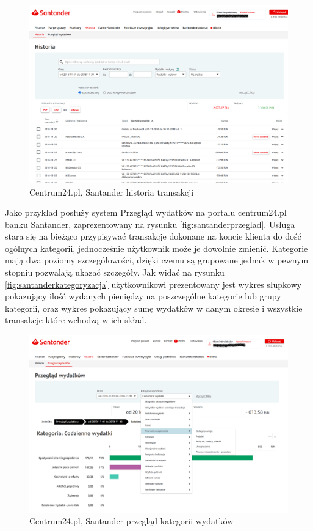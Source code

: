 \documentclass[a4paper, 10pt, twoside, openright]{report}
\begin{document}
\begin{large}
\begin{figure}[H]           %
    \centering
    \includegraphics[width=12cm]{figures/Santander_PrzegladWydatkow_historia.png}
    \caption{Centrum24.pl, Santander historia transakcji}
    \label{fig:santanderhistoria}
\end{figure}

{Jako przykład posłuży system Przegląd wydatków na portalu centrum24.pl banku 
Santander, zaprezentowany na rysunku \ref{fig:santanderprzeglad}. Usługa stara 
się na bieżąco przypisywać transakcje dokonane na koncie klienta do dość 
ogólnych kategorii, jednocześnie użytkownik może je dowolnie zmienić. Kategorie 
mają dwa poziomy szczegółowości, dzięki czemu są grupowane jednak w pewnym 
stopniu pozwalają ukazać szczegóły. Jak widać na rysunku 
\ref{fig:santanderkategoryzacja} użytkownikowi prezentowany jest wykres słupkowy
 pokazujący ilość wydanych pieniędzy na poszczególne kategorie lub grupy 
kategorii, oraz wykres pokazujący sumę wydatków w danym okresie i wszystkie 
transakcje które wchodzą w ich skład.}

\begin{figure}[H]           %
    \centering
    \includegraphics[width=12cm]{figures/Santander_PrzegladWydatkow_przeglad_kategoria.png}
    \caption{Centrum24.pl, Santander przegląd kategorii wydatków}
    \label{fig:santanderprzegladkategoria}


\end{figure}
\end{large}
\end{document}
